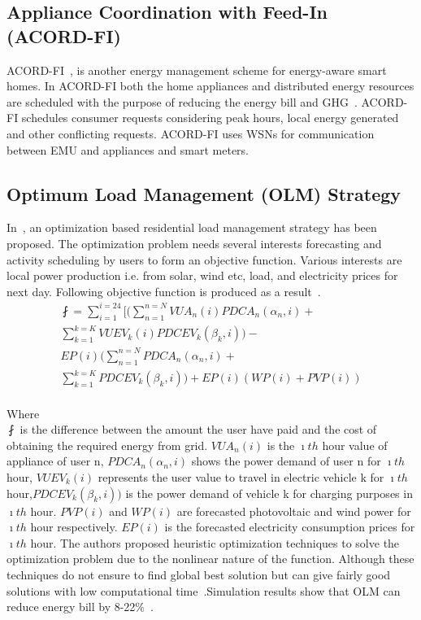 \documentclass[journal]{IEEEtran}
\begin{document}
\subsection{Appliance Coordination with Feed-In (ACORD-FI)}
ACORD-FI~\cite{erol2010using}, is another energy management scheme for energy-aware smart homes. In ACORD-FI both the home appliances and distributed energy resources are scheduled with the purpose of reducing the energy bill and GHG~\cite{erol2010using}. ACORD-FI schedules consumer requests considering peak hours, local energy generated and other conflicting requests. ACORD-FI uses WSNs for communication between EMU and appliances and smart meters.\\
\subsection{Optimum Load Management (OLM) Strategy}
In~\cite{lujano2012optimum}, an optimization based residential load management strategy has been proposed. The optimization problem needs several interests forecasting and activity scheduling by users to form an objective function. Various interests are local power production i.e. from solar, wind etc, load, and electricity prices for next day. Following objective function is produced as a result~\cite{lujano2012optimum}.
\begin{equation}
\begin{split}
\fint=\sum_{i=1}^{i=24}[(\sum_{n=1}^{n=N}VUA_n{(i)}PDCA_n{(\alpha_n{,i})}+\\ \sum_{k=1}^{k=K}VUEV_k(i)PDCEV_k{(\beta_k{,i})})-\\EP(i)(\sum_{n=1}^{n=N}PDCA_n{(\alpha_n{,i})}+\\
\sum_{k=1}^{k=K}PDCEV_k{(\beta_k{,i})})+EP(i)(WP(i)+PVP(i))
\end{split}
\end{equation}\\
Where\\
$\fint$ is the difference between the amount the user have paid and the cost of obtaining the required energy from grid. $VUA_n{(i)}$ is the $\imath th$ hour value of  appliance of user n, $PDCA_n{(\alpha_n{,i})}$ shows the power demand of user n for $\imath th$ hour, $VUEV_k(i)$ represents the user value to travel in electric vehicle k for $\imath th$ hour,$PDCEV_k{(\beta_k{,i})})$ is the power demand of vehicle k for charging purposes in $\imath th$ hour. $PVP(i)$ and $WP(i)$ are forecasted photovoltaic and wind power for $\imath th$ hour respectively. $EP(i)$ is the forecasted electricity consumption prices for $\imath th$ hour.
The authors proposed heuristic optimization techniques to solve the optimization problem due to the nonlinear nature of the function. Although these techniques do not ensure to find global best solution but can give fairly good solutions with low computational time~\cite{lujano2012optimum}.Simulation results show that OLM can reduce energy bill by 8-22\%~\cite{lujano2012optimum}.\\
\end{document}
